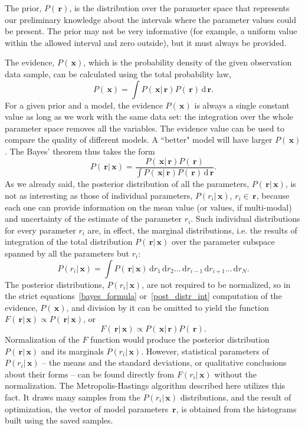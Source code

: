 \documentclass[preprint2]{aastex}
\newcommand{\bfr}{\,\mathbf{r}}
\newcommand{\bfx}{\,\mathbf{x}}
\newcommand{\ud}{\,\mathrm{d}}
\begin{document}
The prior, $P(\bfr)$, is the distribution over the parameter space that represents our preliminary knowledge about the intervals where the parameter values could be present.
The prior may not be very informative (for example, a uniform value within the allowed interval and zero outside), but it must always be provided.  

The evidence, $P(\bfx)$, which is the probability density of the given observation data sample, can be calculated using the total probability law,
\begin{equation}
  P(\bfx) = \int P(\bfx|\bfr)P(\bfr) \ud \bfr.
\end{equation}
For a given prior and a model, the evidence $P(\bfx)$ is always a single constant value as long as we work with the same data set: the integration over the whole parameter space removes all the variables. The evidence value can be used to compare the quality of different models. A ``better" model will have larger $P(\bfx)$. The Bayes' theorem thus takes the form
\begin{equation}
  \label{post_distr_int}
  P(\bfr|\bfx) =  \frac{P(\bfx|\bfr)P(\bfr)}{\int P(\bfx|\bfr)P(\bfr) \ud \bfr}.
\end{equation}
As we already said, the posterior distribution of all the parameters, $P(\bfr|\bfx)$, is not as interesting as those of individual parameters, $P(r_i|\bfx)$, $r_i \in \bfr$, because each one can provide information on the mean value (or values, if multi-modal) and uncertainty of the estimate of the parameter $r_i$. Such individual distributions for every parameter $r_i$ are, in effect, the marginal distributions, i.e. the results of integration of the total distribution $P(\bfr|\bfx)$ over the parameter subspace spanned by all the parameters but $r_i$:
\begin{equation}
  \label{param_post_distr}
  P(r_i|\bfx) =  \int P(\bfr|\bfx)\ud r_1 \ud r_2 ... \ud r_{i-1} \ud r_{i+1} ... \ud r_N.
\end{equation}
The posterior distributions, $P(r_i|\bfx)$, are not required to be normalized, so in the strict equations~\eqref{bayes_formula} or~\eqref{post_distr_int} computation of the evidence, $P(\bfx)$, and division by it can be omitted to yield the function $F(\bfr|\bfx) \propto P(\bfr|\bfx)$, or 
\begin{equation}
  \label{bayes_propor}
  F(\bfr|\bfx) \propto P(\bfx|\bfr)P(\bfr).
\end{equation}
Normalization of the $F$ function would produce the posterior distribution $P(\bfr|\bfx)$ and its marginals $P(r_i|\bfx)$. However, statistical parameters of $P(r_i|\bfx)$ -- the means and the standard deviations, or qualitative conclusions about their forms -- can be found directly from $F(r_i|\bfx)$ without the normalization. The Metropolis-Hastings algorithm described here utilizes this fact. It draws many samples from the $P(r_i|\bfx)$ distributions, and the result of optimization, the vector of model parameters $\bfr$, is obtained from the histograms built using the saved samples. 
\end{document}
